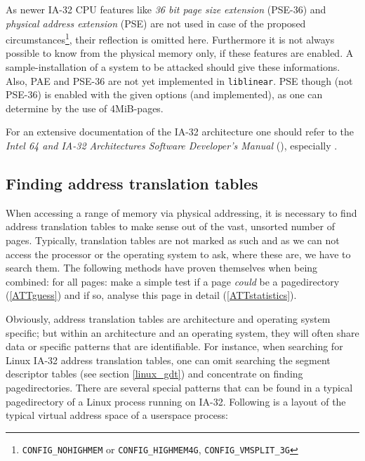 As newer IA-32 CPU features like \emph{36 bit page size extension} (PSE-36) and
\emph{physical address extension} (PSE) are not used in case of the proposed
circumstances\footnote{\texttt{CONFIG\_NOHIGHMEM} or \texttt{CONFIG\_HIGHMEM4G},
\texttt{CONFIG\_VMSPLIT\_3G}}, their reflection is omitted here.  Furthermore it
is not always possible to know from the physical memory only, if these features
are enabled.  A sample-installation of a system to be attacked should give these
informations.  Also, PAE and PSE-36 are not yet implemented in
\texttt{liblinear}. PSE though (not PSE-36) is enabled with the given options
(and implemented), as one can determine by the use of 4MiB-pages.

For an extensive documentation of the IA-32 architecture one should refer to the
\emph{Intel 64 and IA-32 Architectures Software Developer's Manual}
(\cite{IA32_SDM_1:2006,IA32_SDM_2a:2006,IA32_SDM_2b:2006,IA32_SDM_3a:2006,IA32_SDM_3b:2006}),
especially \cite{IA32_SDM_3a:2006}.



\subsection{Finding address translation tables}
\label{findingATT}

When accessing a range of memory via physical addressing, it is necessary to
find address translation tables to make sense out of the vast, unsorted number
of pages. Typically, translation tables are not marked as such and as we can not
access the processor or the operating system to ask, where these are, we have to
search them. The following methods have proven themselves when being combined:
for all pages: make a simple test if a page \emph{could} be a pagedirectory
(\ref{ATTguess}) and if so, analyse this page in detail (\ref{ATTstatistics}).




\label{ATTguess} Obviously, address translation tables are architecture and
operating system specific; but within an architecture and an operating system,
they will often share data or specific patterns that are identifiable. For
instance, when searching for Linux IA-32 address translation tables, one can
omit searching the segment descriptor tables (see section \ref{linux_gdt}) and
concentrate on finding pagedirectories. There are several special patterns that
can be found in a typical pagedirectory of a Linux process running on IA-32.
Following is a layout of the typical virtual address space of a userspace
process:

